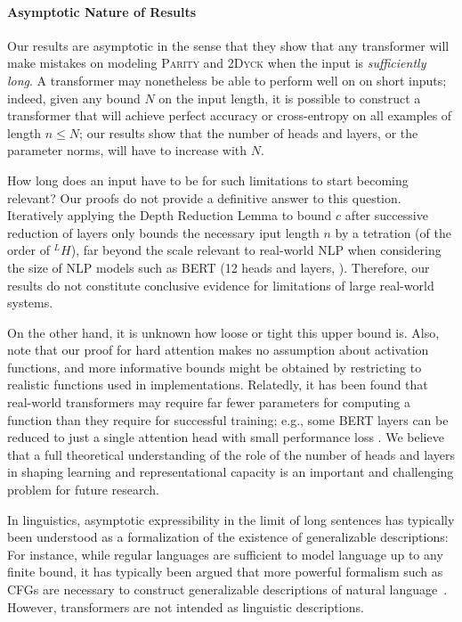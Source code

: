 \documentclass[11pt,a4paper]{article}
\begin{document}
\paragraph{Asymptotic Nature of Results}
Our results are asymptotic in the sense that they show that any transformer will make mistakes on modeling \textsc{Parity} and \textsc{2Dyck} when the input is \emph{sufficiently long}.
A transformer may nonetheless be able to perform well on on short inputs; indeed, given any bound $N$ on the input length, it is possible to construct a transformer that will achieve perfect accuracy or cross-entropy on all examples of length $n \leq N$; our results show that the number of heads and layers, or the parameter norms, will have to increase with $N$.

How long does an input have to be for such limitations to start becoming relevant?
Our proofs do not provide a definitive answer to this question.
Iteratively applying the Depth Reduction Lemma to bound $c$ after successive reduction of layers only bounds the necessary iput length $n$ by a tetration (of the order of $^L H$), far beyond the scale relevant to real-world NLP when considering the size of NLP models such as BERT (12 heads and layers, \citet{devlin2018bert}).
Therefore, our results do not constitute conclusive evidence for limitations of large real-world systems.

On the other hand, it is unknown how loose or tight this upper bound is.
Also, note that our proof for hard attention makes no assumption about activation functions, and more informative bounds might be obtained by restricting to realistic functions used in implementations.
Relatedly, it has been found that real-world transformers may require far fewer parameters for computing a function than they require for successful training; e.g., some BERT layers can be reduced to just a single attention head with small performance loss \citep{michel2019sixteen,voita2019analyzing}.
We believe that a full theoretical understanding of the role of the number of heads and layers in shaping learning and representational capacity is an important and challenging problem for future research.

In linguistics, asymptotic expressibility in the limit of long sentences has typically been understood as a formalization of the existence of generalizable descriptions:
For instance, while regular languages are sufficient to model language up to any finite bound, it has typically been argued that more powerful formalism such as CFGs are necessary to construct generalizable descriptions of natural language~\citep{chomsky1957syntactic}.
However, transformers are not intended as linguistic descriptions.
\end{document}
